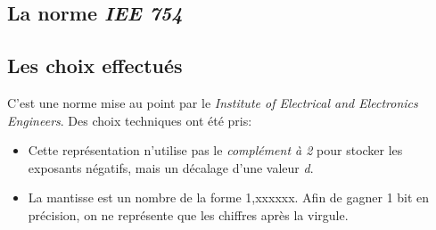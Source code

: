 \documentclass[a4paper,11pt]{article}
\begin{document}
\begin{Form}
\section{La norme \emph{IEE 754}}
\subsection{Les choix effectués}
C'est une norme mise au point par le \emph{Institute of Electrical and Electronics Engineers}. Des choix techniques ont été pris:
\begin{itemize}
\item Cette représentation n'utilise pas le \emph{complément à 2} pour stocker les exposants négatifs, mais un décalage d'une valeur \emph{d}.
\item La mantisse est un nombre de la forme 1,xxxxxx. Afin de gagner 1 bit en précision, on ne représente que les chiffres après la virgule.
\end{itemize}

\end{Form}
\end{document}

